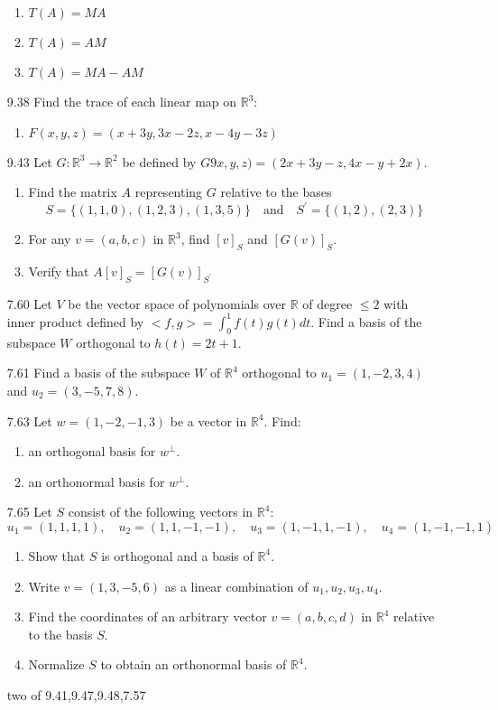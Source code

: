 \documentclass[12pt]{article}
\theoremstyle{definition}
\theoremstyle{plain}
\begin{document}
\begin{enumerate}
\begin{enumerate}
	\item $T(A)=MA$
	\item $T(A)=AM$
	\item $T(A)=MA-AM$
	\end{enumerate}
\item[9.38]Find the trace of each linear map on $\mathbb{R}^3$:
	\begin{enumerate}
	\item $F(x,y,z)=(x+3y,3x-2z,x-4y-3z)$
	\end{enumerate}
\item[9.43]Let $G:\mathbb{R}^3\rightarrow\mathbb{R}^2$ be defined by $G9x,y,z)=(2x+3y-z,4x-y+2x)$.
	\begin{enumerate}
	\item Find the matrix $A$ representing $G$ relative to the bases
	\[ S=\{(1,1,0),(1,2,3),(1,3,5)\} \quad \mathrm{and} \quad S^\prime = \{(1,2),(2,3)\} \]
	\item For any $v=(a,b,c)$ in $\mathbb{R}^3$, find $[v]_S$ and $[G(v)]_S$.
	\item Verify that $A[v]_S=[G(v)]_{S^\prime}$
	\end{enumerate}
\item[7.60]Let $V$ be the vector space of polynomials over $\mathbb{R}$ of degree $\leq 2$ with inner product defined by $<f,g>=\int_0^1f(t)g(t)dt$. Find a basis of the subspace $W$ orthogonal to $h(t)=2t+1$.
\item[7.61]Find a basis of the subspace $W$ of $\mathbb{R}^4$ orthogonal to $u_1=(1,-2,3,4)$ and $u_2=(3,-5,7,8)$.
\item[7.63]Let $w=(1,-2,-1,3)$ be a vector in $\mathbb{R}^4$. Find:
	\begin{enumerate}
	\item an orthogonal basis for $w^\perp$.
	\item an orthonormal basis for $w^\perp$.
	\end{enumerate}
\item[7.65]Let $S$ consist of the following vectors in $\mathbb{R}^4$:
\[ u_1=(1,1,1,1), \quad u_2=(1,1,-1,-1), \quad u_3=(1,-1,1,-1), \quad u_4=(1,-1,-1,1) \]
	\begin{enumerate}
	\item Show that $S$ is orthogonal and a basis of $\mathbb{R}^4$.
	\item Write $v=(1,3,-5,6)$ as a linear combination of $u_1,u_2,u_3,u_4$.
	\item Find the coordinates of an arbitrary vector $v=(a,b,c,d)$ in $\mathbb{R}^4$ relative to the basis $S$.
	\item Normalize $S$ to obtain an orthonormal basis of $\mathbb{R}^4$.
	\end{enumerate}


two of 9.41,9.47,9.48,7.57






\end{enumerate}
\end{document}
